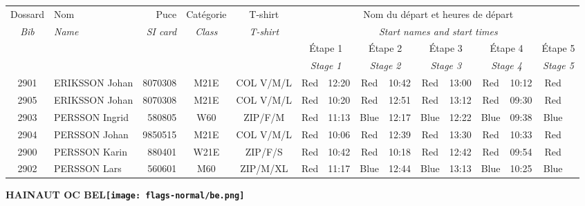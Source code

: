 \documentclass{report}
\begin{document}
  \begin{longtable}{|c|l|r|c|c|*{5}{cc|}}
    Dossard & Nom  & Puce    & Catégorie & T-shirt & \multicolumn{10}{c|}{Nom du départ et heures de départ} \\
    \itshape Bib     & \itshape Name & \itshape SI card & \itshape Class  & \itshape  T-shirt  & \multicolumn{10}{c|}{\itshape Start names and start times} \\
    \hline
    & & & & & \multicolumn{2}{c|}{Étape 1} & \multicolumn{2}{c|}{Étape 2} & \multicolumn{2}{c|}{Étape 3} & \multicolumn{2}{c|}{Étape 4} & \multicolumn{2}{c|}{Étape 5} \\
    & & & & & \multicolumn{2}{c|}{\itshape Stage 1} & \multicolumn{2}{c|}{\itshape Stage 2} & \multicolumn{2}{c|}{\itshape Stage 3} & \multicolumn{2}{c|}{\itshape Stage 4} & \multicolumn{2}{c|}{\itshape Stage 5} \\
    \hline
    2901 & ERIKSSON Johan & 8070308 & M21E & COL V/M/L & Red & 12:20 & Red & 10:42 & Red & 13:00 & Red & 10:12 & Red &  \\
    2905 & ERIKSSON Johan & 8070308 & M21E & COL V/M/L & Red & 10:20 & Red & 12:51 & Red & 13:12 & Red & 09:30 & Red &  \\
    2903 & PERSSON Ingrid & 580805 & W60 & ZIP/F/M & Red & 11:13 & Blue & 12:17 & Blue & 12:22 & Blue & 09:38 & Blue &  \\
    2904 & PERSSON Johan & 9850515 & M21E & COL V/M/L & Red & 10:06 & Red & 12:39 & Red & 13:30 & Red & 10:33 & Red &  \\
    2900 & PERSSON Karin & 880401 & W21E & ZIP/F/S & Red & 10:42 & Red & 10:18 & Red & 12:42 & Red & 09:54 & Red &  \\
    2902 & PERSSON Lars & 560601 & M60 & ZIP/M/XL & Red & 11:17 & Blue & 12:44 & Blue & 13:13 & Blue & 10:25 & Blue &  \\
  \end{longtable}
\newpage
  \Huge \centering \bfseries HAINAUT OC  BEL\normalfont \footnotesize \sffamily \hfill \texttt{[image: flags-normal/be.png]} \newline 
\end{document}
